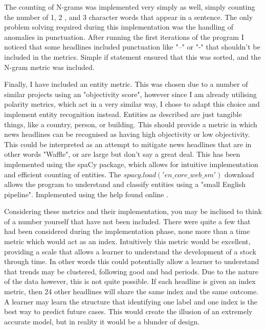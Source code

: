 \documentclass[11pt, a4paper]{article}
\begin{document}
The counting of N-grams was implemented very simply as well, simply counting the number of 1, 2 , and 3 character words that appear in a sentence. The only problem solving required during this implementation was the handling of anomalies in punctuation. After running the first iterations of the program I noticed that some headlines included punctuation like "--" or "-" that shouldn't be included in the metrics. Simple if statement ensured that this was sorted, and the N-gram metric was included.

Finally, I have included an entity metric. This was chosen due to a number of similar projects using an "objectivity score", however since I am already utilising polarity metrics, which act in a very similar way, I chose to adapt this choice and implement entity recognition instead. Entities as described are just tangible things, like a country, person, or building. This should provide a metric in which news headlines can be recognised as having high objectivity or low objectivity. This could be interpreted as an attempt to mitigate news headlines that are in other words "Waffle", or are large but don't say a great deal. This has been implemented using the spaCy package, which allows for intuitive implementation and efficient counting of entities. The $spacy.load('en\_core\_web\_sm')$ download allows the program to understand and classify entities using a "small English pipeline"\cite{Spacy}.
Implemented using the help found online \cite{Spacy2}.

Considering these metrics and their implementation, you may be inclined to think of a number yourself that have not been included. There were quite a few that had been considered during the implementation phase, none more than a time metric which would act as an index. Intuitively this metric would be excellent, providing a scale that allows a learner to understand the development of a stock through time. In other words this could potentially allow a learner to understand that trends may be clustered, following good and bad periods. Due to the nature of the data however, this is not quite possible. If each headline is given an index metric, then 24 other headlines will share the same index and the same outcome. A learner may learn the structure that identifying one label and one index is the best way to predict future cases. This would create the illusion of an extremely accurate model, but in reality it would be a blunder of design.


\newpage
\end{document}
